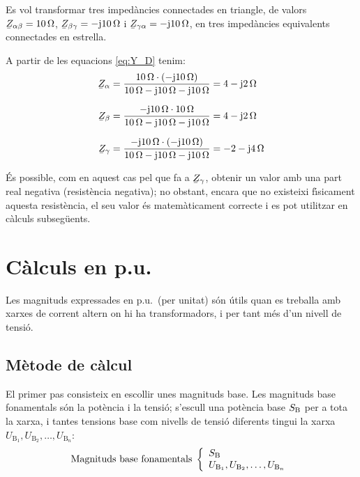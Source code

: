 \begin{exemple}
Es vol transformar tres imped\`{a}ncies connectades en triangle, de
valors $ \cmplx{Z}_{\alpha\beta}=10\unit{\ohm}$,
$\cmplx{Z}_{\beta\gamma}=-\ju10\unit{\ohm}$ i
$\cmplx{Z}_{\gamma\alpha}=-\ju10\unit{\ohm}$, en tres imped\`{a}ncies
equivalents connectades en estrella.

A partir de les equacions \eqref{eq:Y_D}  tenim:
\begin{align*}
   \cmplx{Z}_{\alpha} & = \frac{10\unit{\ohm}\cdot(-\ju10\unit{\ohm})}{10\unit{\ohm} - \ju10\unit{\ohm} - \ju10\unit{\ohm}} = 4 - \ju 2\unit{\ohm} \\[1.5ex]
   \cmplx{Z}_{\beta} & = \frac{-\ju10\unit{\ohm}\cdot10\unit{\ohm}}{10\unit{\ohm} - \ju10\unit{\ohm} - \ju10\unit{\ohm}} = 4 - \ju 2\unit{\ohm} \\[1.5ex]
\cmplx{Z}_{\gamma} &=
\frac{-\ju10\unit{\ohm}\cdot(-\ju10\unit{\ohm})}{10\unit{\ohm} -
\ju10\unit{\ohm} - \ju10\unit{\ohm}} = -2 - \ju 4\unit{\ohm}
\end{align*}

\'{E}s possible, com en aquest cas pel que fa a $\cmplx{Z}_{\gamma}$,
obtenir un valor amb una part real negativa (resist\`{e}ncia negativa);
no obstant, encara que no existeixi f\'{\i}sicament aquesta resist\`{e}ncia,
el seu valor \'{e}s matem\`{a}ticament correcte i es pot utilitzar en
c\`{a}lculs subseg\"{u}ents.
\end{exemple}


\section{C\`{a}lculs en p.u.} \label{sec:seccio_pu} 

Les magnituds expressades en p.u.\ (per unitat) s\'{o}n \'{u}tils quan es treballa
amb xarxes de corrent altern on hi ha transformadors, i per tant m\'{e}s d'un nivell de tensi\'{o}.

\subsection{M\`{e}tode de c\`{a}lcul} 

 El primer pas consisteix en escollir unes magnituds
base. Les magnituds base fonamentals s\'{o}n la pot\`{e}ncia i la tensi\'{o}; s'escull una pot\`{e}ncia
base $S_\mathrm{B}$ per a tota la xarxa, i tantes tensions base com nivells de tensi\'{o} diferents
tingui la xarxa $U_{\text{B}_1}, U_{\text{B}_2}, \ldots, U_{\text{B}_n}$:
\begin{equation}
   \text{Magnituds base fonamentals}\;\left\{
\begin{array}{l}
   S_\mathrm{B} \\
   U_{\text{B}_1}, U_{\text{B}_2}, \ldots, U_{\text{B}_n}
\end{array}
\right.
\end{equation}

